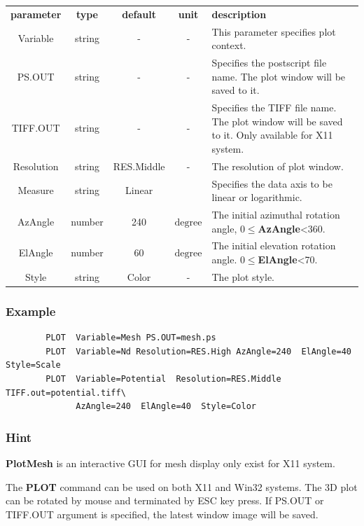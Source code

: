 \documentclass[11pt,pdftex]{article}
\begin{document}
\small
\noindent\begin{longtable}{ccccp{7cm}}
\textbf{parameter}   & \textbf{type}    & \textbf{default} & \textbf{unit} & \textbf{description} \\
Variable      & string  & -  & -             & This parameter specifies plot context.\\
PS.OUT        & string  & -  & -             & Specifies the postscript file name. The plot window will be saved to it.\\
TIFF.OUT      & string  & -  & -             & Specifies the TIFF file name. The plot window will be saved to it.
                                               Only available for X11 system. \\
Resolution    & string  & RES.Middle  & -    & The resolution of plot window.\\
Measure       & string  & Linear &           & Specifies the data axis to be linear or logarithmic.  \\
AzAngle       & number  & 240 & $\mathrm{degree}$  & The initial azimuthal rotation angle, 0$\leq$\textbf{AzAngle}<360. \\
ElAngle       & number  & 60  & $\mathrm{degree}$  & The initial elevation rotation angle. 0$\leq$\textbf{ElAngle}<70.\\
Style         & string  & Color   & -              & The plot style. \\
\end{longtable}
\normalsize

\subsubsection*{Example}
\begin{verbatim}
        PLOT  Variable=Mesh PS.OUT=mesh.ps
        PLOT  Variable=Nd Resolution=RES.High AzAngle=240  ElAngle=40  Style=Scale
        PLOT  Variable=Potential  Resolution=RES.Middle TIFF.out=potential.tiff\
              AzAngle=240  ElAngle=40  Style=Color
\end{verbatim}

\subsubsection*{Hint}
\textbf{PlotMesh} is an interactive GUI for mesh display only exist for X11 system.

The \textbf{PLOT} command can be used on both X11 and Win32 systems.
The 3D plot can be rotated by mouse and terminated by ESC key press.
If PS.OUT or TIFF.OUT argument is specified, the latest window image will be saved.
\end{document}
